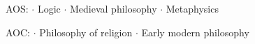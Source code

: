 	\textcolor{highlight2}{AOS: $\cdot$ Logic $\cdot$ Medieval philosophy $\cdot$ Metaphysics}
	
	\vspace*{-1ex}
	\textcolor{highlight2}{AOC: $\cdot$ Philosophy of religion $\cdot$ Early modern philosophy}
